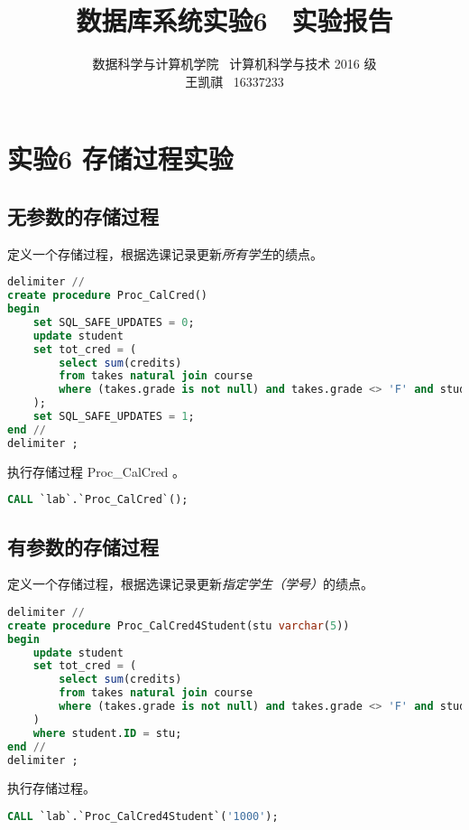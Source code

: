 \documentclass{article}
\begin{document}
\title{数据库系统实验6 \ 实验报告}
\author {数据科学与计算机学院 \ 计算机科学与技术 2016 级 \\ 王凯祺 \ 16337233}
\maketitle

\section{实验6 存储过程实验}

\subsection{无参数的存储过程}

定义一个存储过程，根据选课记录更新\emph{所有学生}的绩点。

\begin{lstlisting}[language=sql]
delimiter //
create procedure Proc_CalCred()
begin
	set SQL_SAFE_UPDATES = 0;
	update student
    set tot_cred = (
		select sum(credits)
        from takes natural join course
        where (takes.grade is not null) and takes.grade <> 'F' and student.ID = takes.ID
    );
    set SQL_SAFE_UPDATES = 1;
end //
delimiter ;
\end{lstlisting}

执行存储过程 Proc\_CalCred 。

\begin{lstlisting}[language=sql]
CALL `lab`.`Proc_CalCred`();
\end{lstlisting}

\subsection{有参数的存储过程}

定义一个存储过程，根据选课记录更新\emph{指定学生（学号）}的绩点。

\begin{lstlisting}[language=sql]
delimiter //
create procedure Proc_CalCred4Student(stu varchar(5))
begin
	update student
    set tot_cred = (
		select sum(credits)
        from takes natural join course
        where (takes.grade is not null) and takes.grade <> 'F' and student.ID = takes.ID
    )
    where student.ID = stu;
end //
delimiter ;
\end{lstlisting}

执行存储过程。

\begin{lstlisting}[language=sql]
CALL `lab`.`Proc_CalCred4Student`('1000');
\end{lstlisting}
\end{document}
